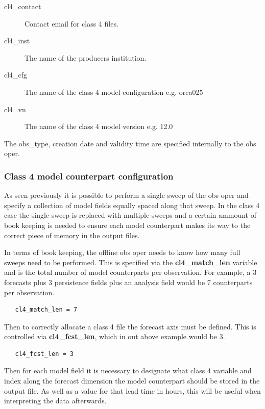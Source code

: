 \begin{description}
\item[cl4\_contact]
Contact email for class 4 files.
\item[cl4\_inst]
The name of the producers institution.
\item[cl4\_cfg]
The name of the class 4 model configuration e.g. orca025
\item[cl4\_vn]
The name of the class 4 model version e.g. 12.0
\end{description}

\noindent
The obs\_type,
creation date and validity time are specified internally to the obs oper.

\subsubsection{Class 4 model counterpart configuration}

As seen previously it is possible to perform a single sweep of the
obs oper and specify a collection of model fields equally spaced 
along that sweep. In the class 4 case the single sweep is replaced
with multiple sweeps and a certain ammount of book keeping is
needed to ensure each model counterpart makes its way to the 
correct piece of memory in the output files.

\noindent
\linebreak
In terms of book keeping, the offline obs oper needs to know how many
full sweeps need to be performed. This is specified via the 
\textbf{cl4\_match\_len} variable and is the total number of model
counterparts per observation. For example, a 3 forecasts plus 3 persistence
fields plus an analysis field would be 7 counterparts per observation.

\begin{alltt}
\tiny
\begin{verbatim}
   cl4_match_len = 7
\end{verbatim}
\end{alltt}

Then to correctly allocate a class 4 file the forecast axis must be defined. This
is controlled via \textbf{cl4\_fcst\_len}, which in out above example would be 3.

\begin{alltt}
\tiny
\begin{verbatim}
   cl4_fcst_len = 3
\end{verbatim}
\end{alltt}

Then for each model field it is necessary to designate what class 4 variable and
index along the forecast dimension the model counterpart should be stored in the
output file. As well as a value for that lead time in hours, this will be useful
when interpreting the data afterwards. 

